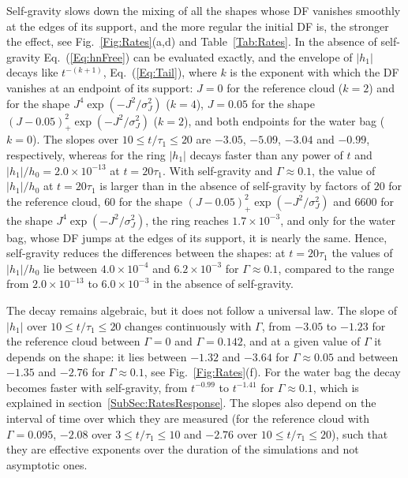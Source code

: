 Self-gravity slows down the mixing of all the shapes whose DF vanishes smoothly at the edges of its support, and the more regular the initial DF is, the stronger the effect, see Fig.~\ref{Fig:Rates}(a,d) and Table~\ref{Tab:Rates}. In the absence of self-gravity Eq.~(\ref{Eq:hnFree}) can be evaluated exactly, and the envelope of $|h_1|$ decays like $t^{-(k+1)}$, Eq.~(\ref{Eq:Tail}), where $k$ is the exponent with which the DF vanishes at an endpoint of its support: $J = 0$ for the reference cloud ($k = 2$) and for the shape $J^4\exp(-J^2/\sigma_J^2)$ ($k = 4$), $J = 0.05$ for the shape $(J - 0.05)_+^2\exp(-J^2/\sigma_J^2)$ ($k = 2$), and both endpoints for the water bag ($k = 0$). The slopes over $10\leq t/\tau_1\leq 20$ are $-3.05$, $-5.09$, $-3.04$ and $-0.99$, respectively, whereas for the ring $|h_1|$ decays faster than any power of $t$ and $|h_1|/h_0 = 2.0\times 10^{-13}$ at $t = 20\tau_1$. With self-gravity and $\Gamma\approx 0.1$, the value of $|h_1|/h_0$ at $t = 20\tau_1$ is larger than in the absence of self-gravity by factors of $20$ for the reference cloud, $60$ for the shape $(J - 0.05)_+^2\exp(-J^2/\sigma_J^2)$ and $6600$ for the shape $J^4\exp(-J^2/\sigma_J^2)$, the ring reaches $1.7\times 10^{-3}$, and only for the water bag, whose DF jumps at the edges of its support, it is nearly the same. Hence, self-gravity reduces the differences between the shapes: at $t = 20\tau_1$ the values of $|h_1|/h_0$ lie between $4.0\times 10^{-4}$ and $6.2\times 10^{-3}$ for $\Gamma\approx 0.1$, compared to the range from $2.0\times 10^{-13}$ to $6.0\times 10^{-3}$ in the absence of self-gravity.

The decay remains algebraic, but it does not follow a universal law. The slope of $|h_1|$ over $10\leq t/\tau_1\leq 20$ changes continuously with $\Gamma$, from $-3.05$ to $-1.23$ for the reference cloud between $\Gamma = 0$ and $\Gamma = 0.142$, and at a given value of $\Gamma$ it depends on the shape: it lies between $-1.32$ and $-3.64$ for $\Gamma\approx 0.05$ and between $-1.35$ and $-2.76$ for $\Gamma\approx 0.1$, see Fig.~\ref{Fig:Rates}(f). For the water bag the decay becomes faster with self-gravity, from $t^{-0.99}$ to $t^{-1.41}$ for $\Gamma\approx 0.1$, which is explained in section~\ref{SubSec:RatesResponse}. The slopes also depend on the interval of time over which they are measured (for the reference cloud with $\Gamma = 0.095$, $-2.08$ over $3\leq t/\tau_1\leq 10$ and $-2.76$ over $10\leq t/\tau_1\leq 20$), such that they are effective exponents over the duration of the simulations and not asymptotic ones.

